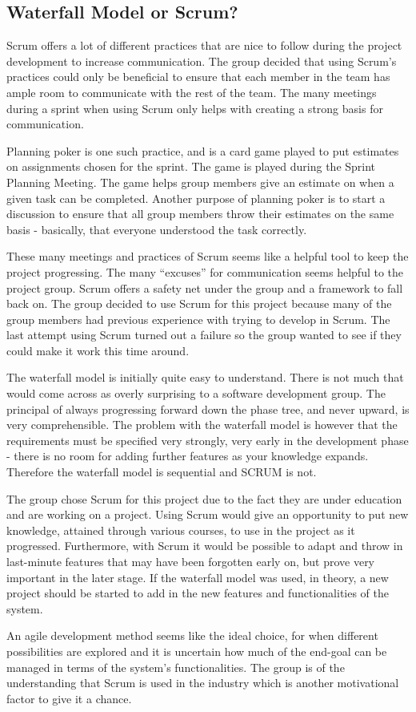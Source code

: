 \subsection{Waterfall Model or Scrum?}

Scrum offers a lot of different practices that are nice to 
follow during the project development to increase 
communication. The group decided that using Scrum's 
practices could only be beneficial to ensure that each 
member in the team has ample room to communicate with
the rest of the team. The many meetings during a sprint when 
using Scrum only helps with 
creating a strong basis for communication.


Planning poker is one such practice, and is a card game 
played to put estimates
on assignments chosen for the sprint. The game is played 
during the Sprint Planning Meeting.
The game helps group members give an estimate on when a 
given task can be completed. Another
purpose of planning poker is to start a discussion to ensure 
that all group members throw
their estimates on the same basis - basically, that everyone 
understood the task correctly.


These many meetings and practices of Scrum seems like a helpful tool to keep the project
progressing. The many ``excuses'' for communication seems helpful to the project 
group. Scrum offers a safety net under the group and a framework to fall back 
on. The group decided to use Scrum for this project because many of the group
members had previous experience with trying to develop in Scrum. The last attempt using Scrum turned out a failure so the group
wanted to see if they could make it work this time around.


The waterfall model is initially quite easy to understand. There is not much that would come
across as overly surprising to a software development group. The principal of always
progressing forward down the phase tree, and never upward, is very comprehensible. The
problem with the waterfall model is however that the requirements must be specified very
strongly, very early in the development phase - there is no room for adding further features
as your knowledge expands. Therefore the waterfall model is sequential and SCRUM is
not\cite{waterfallexplained}. 


The group chose Scrum for this project due to the fact they are under education and are working on
a project. Using Scrum would give an opportunity to put new knowledge, attained through
various courses, to use in the project as it progressed\cite{waterfallvsagile11}. 
Furthermore, with Scrum it would be possible to adapt and throw in last-minute features that may have been
forgotten early on, but prove very important in the later stage. If the waterfall model was used, in theory, a new project should be started to add in 
the new features and functionalities of the system\cite{waterfallexplained}. 


An agile development method seems like the ideal choice, for when different 
possibilities are explored and it is uncertain how much of the end-goal can be 
managed in terms of the system's functionalities\cite{waterfallvsagile11}.
The group is of the understanding that Scrum is used in the industry which is another motivational factor to give it a chance.